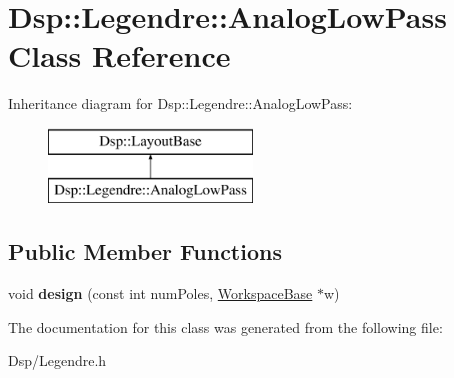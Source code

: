 \hypertarget{classDsp_1_1Legendre_1_1AnalogLowPass}{\section{Dsp\-:\-:Legendre\-:\-:Analog\-Low\-Pass Class Reference}
\label{classDsp_1_1Legendre_1_1AnalogLowPass}
}
Inheritance diagram for Dsp\-:\-:Legendre\-:\-:Analog\-Low\-Pass\-:\begin{figure}[H]
\begin{center}
\leavevmode
\includegraphics[height=2.000000cm]{classDsp_1_1Legendre_1_1AnalogLowPass}
\end{center}
\end{figure}
\subsection*{Public Member Functions}
\begin{DoxyCompactItemize}
\item 
\hypertarget{classDsp_1_1Legendre_1_1AnalogLowPass_a56f5aa6783b11864d54ea380679abc86}{void {\bfseries design} (const int num\-Poles, \hyperlink{structDsp_1_1Legendre_1_1WorkspaceBase}{Workspace\-Base} $\ast$w)}\label{classDsp_1_1Legendre_1_1AnalogLowPass_a56f5aa6783b11864d54ea380679abc86}

\end{DoxyCompactItemize}


The documentation for this class was generated from the following file\-:\begin{DoxyCompactItemize}
\item 
Dsp/Legendre.\-h\end{DoxyCompactItemize}
